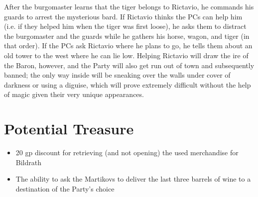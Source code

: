 \documentclass[a4paper,11pt]{article}
\begin{document}
After the burgomaster learns that the tiger belongs to Rictavio, he commands his guards to arrest the mysterious 
bard. If Rictavio thinks the PCs can help him (i.e. if they helped him when the tiger was first loose), he asks 
them to distract the burgomaster and the guards while he gathers his horse, wagon, and tiger (in that order). If 
the PCs ask Rictavio where he plans to go, he tells them about an old tower to the west where he can lie low.
Helping Rictavio will draw the ire of the Baron, however, and the Party will also get run out of town and
subsequently banned; the only way inside will be sneaking over the walls under cover of darkness or using a 
diguise, which will prove extremely difficult without the help of magic given their very unique appearances.

\section{Potential Treasure}
\label{sec:PotentialTreasure}
\begin{itemize}
  \item 20 gp discount for retrieving (and not opening) the used merchandise for Bildrath
  \item The ability to ask the Martikovs to deliver the last three barrels of wine to a destination of the 
  Party's choice
\end{itemize}
\end{document}
